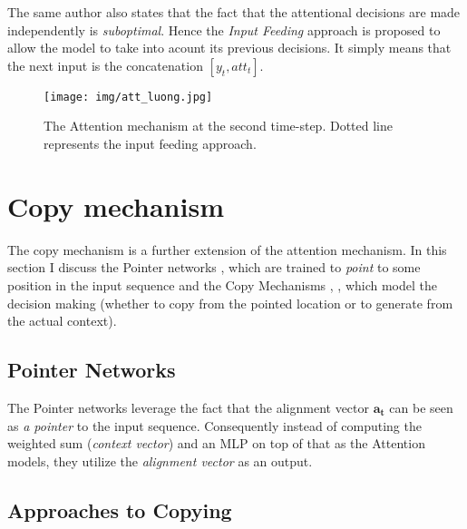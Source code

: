 The same author also states that the fact that the attentional decisions are made independently is \emph{suboptimal}. Hence the \emph{Input Feeding} approach is proposed to allow the model to take into acount its previous decisions. It simply means that the next input is the concatenation $[y_t, att_t]$.

\begin{figure}[!h]
    \centering
    \texttt{[image: img/att\_luong.jpg]}
    \caption{\centering The Attention mechanism at the second time-step. Dotted line represents the input feeding approach.}
\end{figure}


\section{Copy mechanism} \label{copy_mech_sec}
The copy mechanism is a further extension of the attention mechanism. In this section I discuss the Pointer networks \citep{vinyals2015pointer}, which are trained to \emph{point} to some position in the input sequence and the Copy Mechanisms \citep{gulcehre2016pointing}, \citep{gu2016incorporating}, \citep{yang2016referenceaware} which model the decision making (whether to copy from the pointed location or to generate from the actual context).

\subsection{Pointer Networks}

The Pointer networks \citep{vinyals2015pointer} leverage the fact that the alignment vector $\mathbf{a_t}$  can be seen as \emph{a pointer} to the input sequence. Consequently instead of computing the weighted sum (\emph{context vector}) and an MLP on top of that as the Attention models, they utilize the \emph{alignment vector} as an output.

\subsection{Approaches to Copying}

